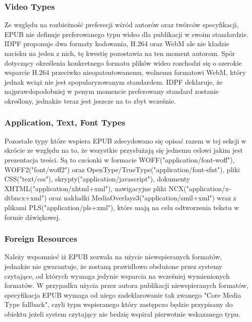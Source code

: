 \subsubsection*{Video Types}

Ze względu na rozbieżność preferecji wśród autorów oraz twórców specyfikacji, EPUB nie definuje preferowanego typu wideo dla publikacji w swoim standardzie. IDPF proponuje dwa formaty kodowania, H.264 oraz WebM ale nie kładzie nacisku na jeden z nich, tę kwestię pozostawia na ten moment autorom. Spór dotyczący określenia konkretnego formatu plików wideo rozchodzi się o szerokie wsparcie H.264 przeciwko nieopatentowanemu, wolnemu formatowi WebM, który jednak wciąż nie jest spopularyzowanym standardem. IDPF deklaruje, że najprawdopodobniej w penym momencie preferowany standard zostanie określony, jednakże teraz jest jeszcze na to zbyt wcześnie\cite{WhatIsEPUB3Video}.

\subsubsection*{Application, Text, Font Types}

Pozostałe typy które wspiera EPUB zdecydowano się opisać razem w tej sekcji w skrócie ze względu na to, że wszystkie przysłużają się jednemu celowi jakim jest prezentacja treści. Są to czcionki w formacie WOFF("application/font-woff"), WOFF2("font/woff2") oraz OpenType/TrueType("application/font-sfnt"), pliki CSS("text/css"), skrypty("application/javascript"), dokumenty XHTML("application/xhtml+xml"), nawigacyjne pliki NCX("application/x-dtbncx+xml") oraz nakładki MediaOverlays3("application/smil+xml") wraz z plikami PLS("application/pls+xml"), które mają na celu odtworzenia tekstu w formie dźwiękowej\cite{EPUBCoreMediaTypes}.

\subsubsection*{Foreign Resources}

Należy wspomnieć iż EPUB zezwala na użycie niewspieranych formatów, jednakże nie gwarantuje, że zostaną prawidłowo obsłużone przez systemy czytające, od których wymaga jedynie wsparcia na wcześniej wymienionych formatów. W przypadku użycia przez autora publikacji niewspieranych formatów, specyfikacja EPUB wymaga od niego zadeklarowanie tak zwanego "Core Media Type fallback", czyli typu wspieranego który zastępczo będzie przypisany do obiektu jeżeli system czytający nie bedzię wspirał pierwotnie wskazanego typu\cite{EPUBSpecificationForeignResources}.
